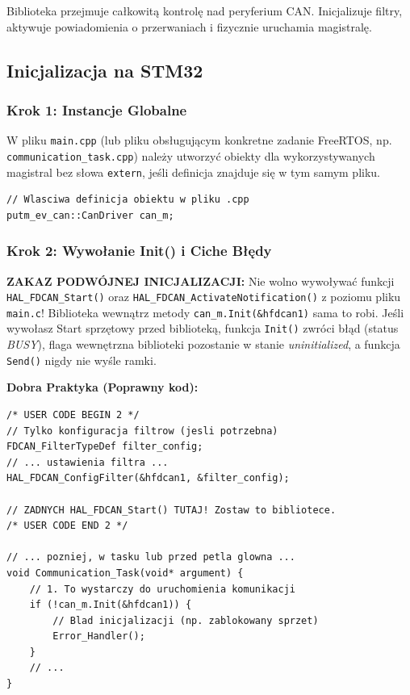 \documentclass[a4paper,11pt]{article}
\begin{document}
Biblioteka przejmuje całkowitą kontrolę nad peryferium CAN. Inicjalizuje filtry, aktywuje powiadomienia o przerwaniach i fizycznie uruchamia magistralę.

\begin{stm32box}
\subsection*{Inicjalizacja na STM32}

\subsubsection*{Krok 1: Instancje Globalne}
W pliku \texttt{main.cpp} (lub pliku obsługującym konkretne zadanie FreeRTOS, np. \texttt{communication\_task.cpp}) należy utworzyć obiekty dla wykorzystywanych magistral bez słowa \texttt{extern}, jeśli definicja znajduje się w tym samym pliku.

\begin{lstlisting}
// Wlasciwa definicja obiektu w pliku .cpp
putm_ev_can::CanDriver can_m; 
\end{lstlisting}

\subsubsection*{Krok 2: Wywołanie Init() i Ciche Błędy}
\textcolor{warningred}{\textbf{ZAKAZ PODWÓJNEJ INICJALIZACJI:}} Nie wolno wywoływać funkcji \texttt{HAL\_FDCAN\_Start()} oraz \texttt{HAL\_FDCAN\_ActivateNotification()} z poziomu pliku \texttt{main.c}! 
Biblioteka wewnątrz metody \texttt{can\_m.Init(\&hfdcan1)} sama to robi. Jeśli wywołasz Start sprzętowy przed biblioteką, funkcja \texttt{Init()} zwróci błąd (status \textit{BUSY}), flaga wewnętrzna biblioteki pozostanie w stanie \textit{uninitialized}, a funkcja \texttt{Send()} nigdy nie wyśle ramki.

\textbf{Dobra Praktyka (Poprawny kod):}
\begin{lstlisting}
/* USER CODE BEGIN 2 */
// Tylko konfiguracja filtrow (jesli potrzebna)
FDCAN_FilterTypeDef filter_config;
// ... ustawienia filtra ...
HAL_FDCAN_ConfigFilter(&hfdcan1, &filter_config);

// ZADNYCH HAL_FDCAN_Start() TUTAJ! Zostaw to bibliotece.
/* USER CODE END 2 */

// ... pozniej, w tasku lub przed petla glowna ...
void Communication_Task(void* argument) {
    // 1. To wystarczy do uruchomienia komunikacji
    if (!can_m.Init(&hfdcan1)) {
        // Blad inicjalizacji (np. zablokowany sprzet)
        Error_Handler(); 
    }
    // ...
}
\end{lstlisting}
\end{stm32box}
\end{document}
